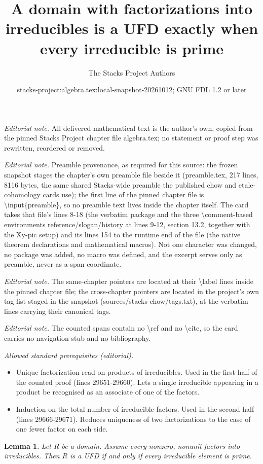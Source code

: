\documentclass[10pt,a4paper]{amsart}
\title{A domain with factorizations into irreducibles is a UFD exactly when every irreducible is prime}
\author{The Stacks Project Authors}
\date{stacks-project:algebra.tex:local-snapshot-20261012; GNU FDL 1.2 or later}
\theoremstyle{plain}
\newtheorem{lemma}[subsection]{Lemma}
\theoremstyle{definition}
\theoremstyle{remark}
\numberwithin{equation}{subsection}
\begin{document}
\maketitle
\noindent\textit{Editorial note.} All delivered mathematical text is the author's own, copied from the pinned Stacks Project chapter file algebra.tex; no statement or proof step was rewritten, reordered or removed.\par\medskip
\noindent\textit{Editorial note.} Preamble provenance, as required for this source: the frozen snapshot stages the chapter's own preamble file beside it (preamble.tex, 217 lines, 8116 bytes, the same shared Stacks-wide preamble the published chow and etale-cohomology cards use); the first line of the pinned chapter file is \textbackslash{}input\{preamble\}, so no preamble text lives inside the chapter itself. The card takes that file's lines 8-18 (the verbatim package and the three \textbackslash{}comment-based environments reference/slogan/history at lines 9-12, section 13.2, together with the Xy-pic setup) and its lines 154 to the runtime end of the file (the native theorem declarations and mathematical macros). Not one character was changed, no package was added, no macro was defined, and the excerpt serves only as preamble, never as a span coordinate.\par\medskip
\noindent\textit{Editorial note.} The same-chapter pointers are located at their \textbackslash{}label lines inside the pinned chapter file; the cross-chapter pointers are located in the project's own tag list staged in the snapshot (sources/stacks-chow/tags.txt), at the verbatim lines carrying their canonical tags.\par\medskip
\noindent\textit{Editorial note.} The counted spans contain no \textbackslash{}ref and no \textbackslash{}cite, so the card carries no navigation stub and no bibliography.\par\medskip
\noindent\textit{Allowed standard prerequisites (editorial).}\begin{itemize}
\item Unique factorization read on products of irreducibles. Used in the first half of the counted proof (lines 29651-29660). Lets a single irreducible appearing in a product be recognised as an associate of one of the factors.
\item Induction on the total number of irreducible factors. Used in the second half (lines 29666-29671). Reduces uniqueness of two factorizations to the case of one fewer factor on each side.
\end{itemize}\medskip
\begin{lemma}
\label{lemma-characterize-UFD}
Let $R$ be a domain. Assume every nonzero, nonunit factors into
irreducibles. Then $R$ is a UFD if and only if every irreducible
element is prime.
\end{lemma}
\end{document}
